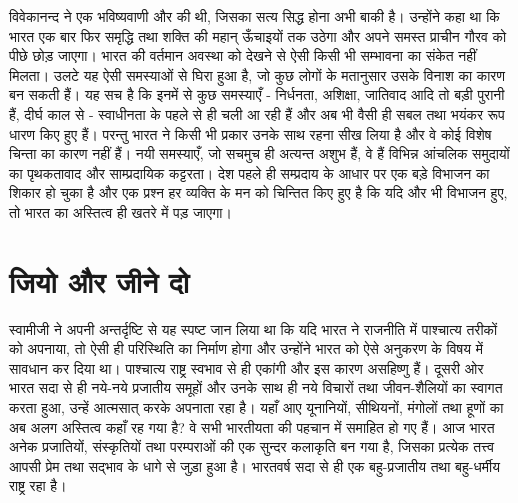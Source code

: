 विवेकानन्द ने एक भविष्यवाणी और की थी, जिसका सत्य सिद्ध होना अभी बाकी है। उन्होंने कहा था कि भारत एक बार फिर समृद्धि तथा शक्ति की महान् ऊँचाइयों तक उठेगा और अपने समस्त प्राचीन गौरव को पीछे छोड़ जाएगा। भारत की वर्तमान अवस्था को देखने से ऐसी किसी भी सम्भावना का संकेत नहीं मिलता। उलटे यह ऐसी समस्याओं से घिरा हुआ है, जो कुछ लोगों के मतानुसार उसके विनाश का कारण बन सकती हैं। यह सच है कि इनमें से कुछ समस्याएँ - निर्धनता, अशिक्षा, जातिवाद आदि तो बड़ी पुरानी हैं, दीर्घ काल से - स्वाधीनता के पहले से ही चली आ रही हैं और अब भी वैसी ही सबल तथा भयंकर रूप धारण किए हुए हैं। परन्तु भारत ने किसी भी प्रकार उनके साथ रहना सीख लिया है और वे कोई विशेष चिन्ता का कारण नहीं हैं। नयी समस्याएँ, जो सचमुच ही अत्यन्त अशुभ हैं, वे हैं विभिन्न आंचलिक समुदायों का पृथकतावाद और साम्प्रदायिक कट्टरता। देश पहले ही सम्प्रदाय के आधार पर एक बड़े विभाजन का शिकार हो चुका है और एक प्रश्न हर व्यक्ति के मन को चिन्तित किए हुए है कि यदि और भी विभाजन हुए, तो भारत का अस्तित्व ही खतरे में पड़ जाएगा।


\section*{जियो और जीने दो}

स्वामीजी ने अपनी अन्तर्दृष्टि से यह स्पष्ट जान लिया था कि यदि भारत ने राजनीति में पाश्चात्य तरीकों को अपनाया, तो ऐसी ही परिस्थिति का निर्माण होगा और उन्होंने भारत को ऐसे अनुकरण के विषय में सावधान कर दिया था। पाश्चात्य राष्ट्र स्वभाव से ही एकांगी और इस कारण असहिष्णु हैं। दूसरी ओर भारत सदा से ही नये-नये प्रजातीय समूहों और उनके साथ ही नये विचारों तथा जीवन-शैलियों का स्वागत करता हुआ, उन्हें आत्मसात् करके अपनाता रहा है। यहाँ आए यूनानियों, सीथियनों, मंगोलों तथा हूणों का अब अलग अस्तित्व कहाँ रह गया है? वे सभी भारतीयता की पहचान में समाहित हो गए हैं। आज भारत अनेक प्रजातियों, संस्कृतियों तथा परम्पराओं की एक सुन्दर कलाकृति बन गया है, जिसका प्रत्येक तत्त्व आपसी प्रेम तथा सद्भाव के धागे से जुड़ा हुआ है। भारतवर्ष सदा से ही एक बहु-प्रजातीय तथा बहु-धर्मीय राष्ट्र रहा है। 

